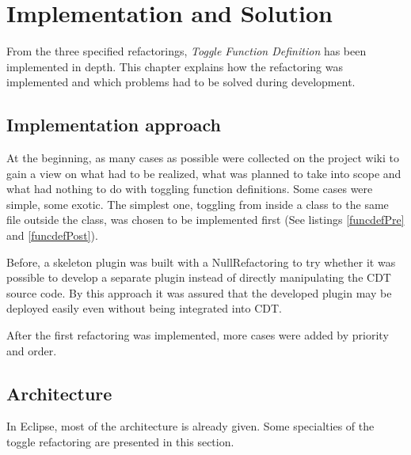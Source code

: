 \chapter{Implementation and Solution}
\thispagestyle{fancy}

From the three specified refactorings, \textit{Toggle Function Definition} has 
been implemented in depth. This chapter explains how the refactoring was 
implemented and which problems had to be solved during development.

\section{Implementation approach}

At the beginning, as many cases as possible were collected on the project wiki 
to gain a view on what had to be realized, what was planned to take into scope 
and what had nothing to do with toggling function definitions. Some cases were 
simple, some exotic. The simplest one, toggling from inside a class to the same 
file outside the class, was chosen to be implemented first (See listings 
\ref{funcdefPre} and \ref{funcdefPost}). 

Before, a skeleton plugin was built with a NullRefactoring to try whether it was
possible to develop a separate plugin instead of directly manipulating the CDT
source code. By this approach it was assured that the developed plugin may be
deployed easily even without being integrated into CDT.

After the first refactoring was implemented, more cases were added by priority
and order.

\section{Architecture}

In Eclipse, most of the architecture is already given. Some specialties of the 
toggle refactoring are presented in this section.

